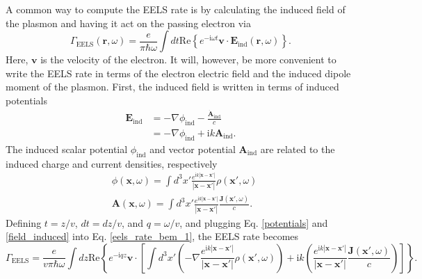 \documentclass [11pt, proquest] {uwthesis}[2016/11/22]
\begin{document}
A common way to compute the EELS rate is by calculating the induced field of the plasmon and having it act on the passing electron via \cite{AbajoRevMod,Hohenester2014,Quillin}
\begin{equation}
\Gamma_{\textrm{EELS}}(\textbf{r},\omega) = \frac{e}{\pi\hbar\omega}\int dt \textrm{Re}\left\{ e^{-\textrm{i}\omega t} \textbf{v} \cdot \textbf{E}_{\textrm{ind}}(\textbf{r},\omega)\right\}.
\label{eels_rate_bem_1}
\end{equation}
Here, $\textbf{v}$ is the velocity of the electron. It will, however, be more convenient to write the EELS rate in terms of the electron electric field and the induced dipole moment of the plasmon. First, the induced field is written in terms of induced potentials
\begin{equation}
\begin{aligned}
\textbf{E}_{\textrm{ind}} &= -\nabla\phi_{\textrm{ind}} - \frac{\dot{\textbf{A}}_{\textrm{ind}}}{c}\\
&= -\nabla\phi_{\textrm{ind}} + \textrm{i}k\textbf{A}_{\textrm{ind}}.
\label{field_induced}
\end{aligned}
\end{equation}
The induced scalar potential $\phi_{\textrm{ind}}$ and vector potential $\textbf{A}_{\textrm{ind}}$ are related to the induced charge and current densities, respectively
\begin{equation}
\begin{aligned}
&\phi(\textbf{x},\omega) = \int d^3x' \frac{e^{\textrm{i}k|\textbf{x}-\textbf{x}'|}}{|\textbf{x}-\textbf{x}'|}\rho(\textbf{x}',\omega)\\
&\textbf{A}(\textbf{x},\omega) = \int d^3x' \frac{e^{\textrm{i}k|\textbf{x}-\textbf{x}'|}}{|\textbf{x}-\textbf{x}'|}\frac{\textbf{J}(\textbf{x}',\omega)}{c}.
\label{potentials}
\end{aligned}
\end{equation}
Defining $t = z/v$, $dt = dz/v$, and $q = \omega/v$, and plugging Eq. \ref{potentials} and \ref{field_induced} into Eq. \ref{eels_rate_bem_1}, the EELS rate becomes
\begin{equation}
\Gamma_{\textrm{EELS}} = \frac{e}{v\pi\hbar\omega}\int dz \textrm{Re}\left\{ e^{-\textrm{i}qz} \textbf{v} \cdot \left[\int d^3x' \left(-\nabla\frac{e^{\textrm{i}k|\textbf{x}-\textbf{x}'|}}{|\textbf{x}-\textbf{x}'|}\rho(\textbf{x}',\omega)\right) + \textrm{i}k\left(\frac{e^{\textrm{i}k|\textbf{x}-\textbf{x}'|}}{|\textbf{x}-\textbf{x}'|}\frac{\textbf{J}(\textbf{x}',\omega)}{c}\right)\right]\right\}.
\label{eels_with_potentials}
\end{equation}
\end{document}
